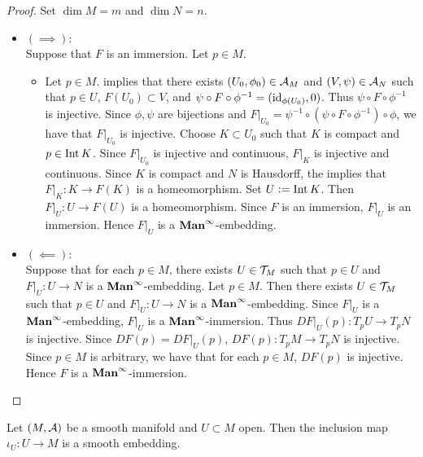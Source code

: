 \documentclass{book}
\begin{document}
	\begin{proof} Set $\dim M = m$ and $\dim N = n$. 
		\begin{itemize}
			\item $(\implies):$ \\
			Suppose that $F$ is an immersion. Let $p \in M$. 
			\begin{itemize}
				\item Let $p \in M$.  implies that there exists $(U_0, \phi_0) \in \mathcal{A}_M$ and $(V, \psi) \in \mathcal{A}_N$ such that $p \in U$, $F(U_0) \subset V$, and $\psi \circ F \circ \phi^{-1} = (\operatorname{id}_{\phi(U_0)}, 0)$. Thus $\psi \circ F \circ \phi^{-1}$ is injective. Since $\phi, \psi$ are bijections and $F|_{U_0} = \psi^{-1} \circ (\psi \circ F \circ \phi^{-1}) \circ \phi$, we have that $F|_{U_0}$ is injective. Choose $K \subset U_0$ such that $K$ is compact and $p \in \operatorname{Int} K$. Since $F|_{U_0}$ is injective and continuous, $F|_{K}$ is injective and continuous. Since $K$ is compact and $N$ is Hausdorff, the  implies that $F|_K: K \rightarrow F(K)$ is a homeomorphism. Set $U \vcentcolon= \operatorname{Int} K$. Then $F|_U:U \rightarrow F(U)$ is a homeomorphism. Since $F$ is an immersion, $F|_U$ is an immersion. Hence $F|_U$ is a $\operatorname*{\text{\textbf{Man}}^{\infty}}$-embedding. 
			\end{itemize}
			\item $(\impliedby):$ \\
			Suppose that for each $p \in M$, there exists $U \in \mathcal{T}_M$ such that $p \in U$ and $F|_U:U \rightarrow N$ is a $\operatorname*{\text{\textbf{Man}}^{\infty}}$-embedding. Let $p \in M$. Then there exists $U \in \mathcal{T}_M$ such that $p \in U$ and $F|_U:U \rightarrow N$ is a $\operatorname*{\text{\textbf{Man}}^{\infty}}$-embedding. Since $F|_U$ is a $\operatorname*{\text{\textbf{Man}}^{\infty}}$-embedding, $F|_U$ is a $\operatorname*{\text{\textbf{Man}}^{\infty}}$-immersion. Thus $DF|_U(p): T_pU \rightarrow T_pN$ is injective. Since $DF(p) = DF|_U(p)$, $DF(p): T_pM \rightarrow T_pN$ is injective. Since $p \in M$ is arbitrary, we have that for each $p \in M$, $DF(p)$ is injective. Hence $F$ is a $\operatorname*{\text{\textbf{Man}}^{\infty}}$-immersion.
		\end{itemize}
	\end{proof}

	\begin{ex} 
		Let $(M, \mathcal{A})$ be a smooth manifold and $U \subset M$ open. Then the inclusion map $\iota_U:U \rightarrow M$ is a smooth embedding. 
	\end{ex}
\end{document}
